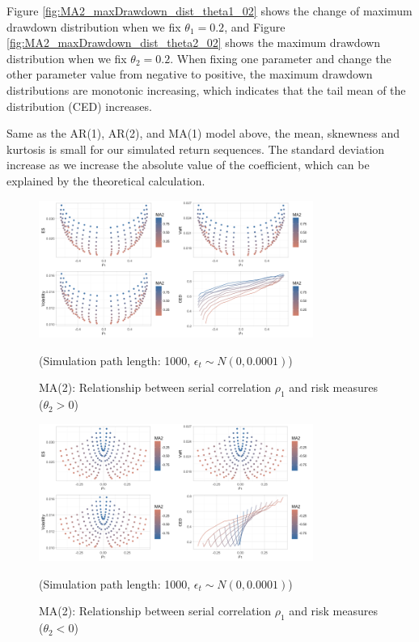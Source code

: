 \documentclass[11pt]{article}
\begin{document}
Figure \ref{fig:MA2_maxDrawdown_dist_theta1_02} shows the change of maximum drawdown distribution when we fix $\theta_1=0.2$, and Figure \ref{fig:MA2_maxDrawdown_dist_theta2_02} shows the maximum drawdown distribution when we fix $\theta_2=0.2$. When fixing one parameter and change the other parameter value from negative to positive, the maximum drawdown distributions are monotonic increasing, which indicates that the tail mean of the distribution (CED) increases.

Same as the AR(1), AR(2), and MA(1) model above, the mean, sknewness and kurtosis is small for our simulated return sequences. The standard deviation increase as we increase the absolute value of the coefficient, which can be explained by the theoretical calculation.

\begin{figure}[H]
\centering
\includegraphics[width = 0.8\textwidth]{../figures/simulation/MA2_risk_measures_pos}
\caption{MA(2): Relationship between serial correlation $\rho_1$ and risk measures ($\theta_2>0$)}
(Simulation path length: 1000, $\epsilon_t \sim N(0, 0.0001)$)
\label{fig:MA2_risk_measures_pos}
\end{figure}

\begin{figure}[H]
\centering
\includegraphics[width = 0.8\textwidth]{../figures/simulation/MA2_risk_measures_neg}
\caption{MA(2): Relationship between serial correlation $\rho_1$ and risk measures ($\theta_2<0$)}
(Simulation path length: 1000, $\epsilon_t \sim N(0, 0.0001)$)
\label{fig:MA2_risk_measures_neg}
\end{figure}
\end{document}
